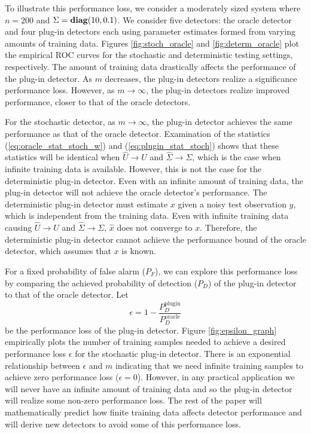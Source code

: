 To illustrate this performance loss, we consider a moderately sized system where $n=200$ and $\Sigma=\mathop{\bf diag}(10,0.1)$. We consider five detectors: the oracle detector and four plug-in detectors each using parameter estimates formed from varying amounts of training data. Figures \ref{fig:stoch_oracle} and \ref{fig:determ_oracle} plot the empirical ROC curves for the stochastic and deterministic testing settings, respectively. The amount of training data drastically affects the performance of the plug-in detector. As $m$ decreases, the plug-in detectors realize a significance performance loss. However, as $m\to\infty$, the plug-in detectors realize improved performance, closer to that of the oracle detectors.

For the stochastic detector, as $m\to\infty$, the plug-in detector achieves the same
performance as that of the oracle detector. Examination of the statistics
(\ref{eq:oracle_stat_stoch_w}) and (\ref{eq:plugin_stat_stoch}) shows that these
statistics will be identical when $\widehat{U}\to U$ and $\widehat{\Sigma}\to\Sigma$,
which is the case when infinite training data is available. However, this is not the case
for the deterministic plug-in detector. Even with an infinite amount of training data, the
plug-in detector will not achieve the oracle detector's performance. The deterministic
plug-in detector must estimate $x$ given a noisy test observation $y$, which is
independent from the training data. Even with infinite training data causing
$\widehat{U}\to U$ and $\widehat{\Sigma}\to\Sigma$, $\widehat{x}$ does not converge to
$x$. Therefore, the deterministic plug-in detector cannot achieve the performance bound of
the oracle detector, which assumes that $x$ is known.

For a fixed probability of false alarm ($P_F$), we can explore this performance loss by comparing the achieved probability of detection ($P_D$) of the plug-in detector to that of the oracle detector. Let
\begin{equation}\label{eq:epsilon}
\epsilon = 1 - \frac{P_D^{\text{plugin}}}{P_D^{\text{oracle}}}
\end{equation}
be the performance loss of the plug-in detector. Figure \ref{fig:epsilon_graph} empirically plots the number of training samples needed to achieve a desired performance loss $\epsilon$ for the stochastic plug-in detector. There is an exponential relationship between $\epsilon$ and $m$ indicating that we need infinite training samples to achieve zero performance loss ($\epsilon=0$). However, in any practical application we will never have an infinite amount of training data and so the plug-in detector will realize some non-zero performance loss. The rest of the paper will mathematically predict how finite training data affects detector performance and will derive new detectors to avoid some of this performance loss.

